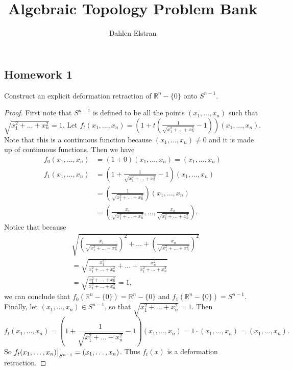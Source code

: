 \documentclass[12pt]{article}
\newenvironment{statement}[2][Statement]{\begin{trivlist}
\item[\hskip \labelsep {\bfseries #1}\hskip \labelsep {\bfseries #2.}]}{\end{trivlist}}
\newcommand{\littletaller}{\vphantom{\big|}}
\newcommand\restr[2]{{%
  \left.\kern-\nulldelimiterspace %
  #1 %
  \littletaller %
  \right|_{#2} %
  }}
\begin{document}
 
\title{Algebraic Topology Problem Bank} 
\author{Dahlen Elstran} 
\maketitle


\subsection{Homework 1}

\begin{statement}[Exercise]{0.2}
    Construct an explicit deformation retraction of $\mathbb{R}^n - \{0\}$ onto $S^{n-1}$.
\end{statement}
\begin{proof}
    First note that $S^{n-1}$ is defined to be all the points $(x_1, \dots, x_n)$ such that 
    $\sqrt{x_1^2+ \dots + x_n^2}=1$. Let $f_t(x_1, \dots , x_n)=(1+t(\frac{1}{\sqrt{x_1^2 + \dots + x_n^2}} - 1))
    (x_1, \dots, x_n)$. Note that this is a continuous function because $(x_1, \dots, x_n) \neq 0$ and it is made up of 
    continuous functions. Then we have
    \begin{align*}
        f_0(x_1, \dots, x_n) &= (1+0)(x_1, \dots, x_n) = (x_1, \dots, x_n) \\
        f_1(x_1, \dots, x_n) &= (1 + \frac{1}{\sqrt{x_1^2 + \dots + x_n^2}} -1)(x_1, \dots, x_n) \\
        &= (\frac{1}{\sqrt{x_1^2 + \dots + x_n^2}})(x_1, \dots, x_n) \\
        &= (\frac{x_1}{\sqrt{x_1^2 + \dots + x_n^2}}, \dots, \frac{x_n}{\sqrt{x_1^2 + \dots + x_n^2}}).
    \end{align*}
    Notice that because 
    \begin{align*}
        & \sqrt{(\frac{x_1}{\sqrt{x_1^2 + \dots + x_n^2}})^2+ \dots + (\frac{x_n}{\sqrt{x_1^2 + \dots + x_n^2}})^2} \\
        & = \sqrt{\frac{x_1^2}{x_1^2 + \dots + x_n^2} + \dots + \frac{x_n^2}{x_1^2 + \dots + x_n^2}} \\
        & = \sqrt{\frac{x_1^2 + \dots + x_n^2}{x_1^2 + \dots + x_n^2}} = 1,
    \end{align*}
    we can conclude that $f_0(\mathbb{R}^n - \{0\})=\mathbb{R}^n - \{0\}$ and $f_1(\mathbb{R}^n - \{0\})=S^{n-1}$.
    Finally, let $(x_1, \dots, x_n) \in S^{n-1}$, so that $\sqrt{x_1^2+ \dots + x_n^2}=1$. Then 
    \begin{equation*}
        f_t(x_1, \dots, x_n)=(1+\frac{1}{\sqrt{x_1^2 + \dots + x_n^2}} - 1)(x_1, \dots, x_n) = 1 \cdot (x_1, \dots, x_n) =  (x_1, \dots, x_n).
    \end{equation*}
    So $\restr{f_t(x_1, \dots, x_n)}{S^{n-1}} = (x_1, \dots, x_n)$. Thus $f_t(x)$ is a deformation retraction.
\end{proof}
\end{document}
